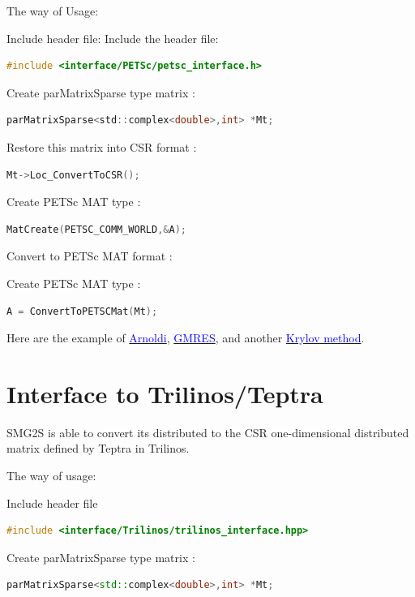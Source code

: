 \documentclass[a4paper, 10 pt]{report}
\begin{document}
	The way of Usage:
	
	Include header file:
	Include the header file:
   \begin{lstlisting}[language=C,frame=single]
   #include <interface/PETSc/petsc_interface.h>
   \end{lstlisting}
	
	Create parMatrixSparse type matrix :
   \begin{lstlisting}[language=C,frame=single]
  parMatrixSparse<std::complex<double>,int> *Mt;
   \end{lstlisting}

	Restore this matrix into CSR format :
   \begin{lstlisting}[language=C,frame=single]
   Mt->Loc_ConvertToCSR();
	\end{lstlisting}

	Create PETSc MAT type :
   \begin{lstlisting}[language=C,frame=single]
   MatCreate(PETSC_COMM_WORLD,&A); 
	\end{lstlisting}

   Convert to PETSc MAT format :

	Create PETSc MAT type :
   \begin{lstlisting}[language=C,frame=single]
   A = ConvertToPETSCMat(Mt); 
   \end{lstlisting}

    Here are the example of \href{https://github.com/SMG2S/SMG2S/tree/master/example/arnoldi}{\textcolor{blue}{Arnoldi}}, \href{https://github.com/SMG2S/SMG2S/tree/master/example/gmres}{\textcolor{blue}{GMRES}}, and another  \href{https://github.com/SMG2S/SMG2S/tree/master/example/krylov}{\textcolor{blue}{Krylov method}}.
    
	\section{Interface to Trilinos/Teptra}
	
	SMG2S is able to convert its distributed to the CSR one-dimensional distributed matrix defined by Teptra in Trilinos.
	
	The way of usage:
	
	 Include header file

	\begin{lstlisting}[language=C++,frame=single]
   #include <interface/Trilinos/trilinos_interface.hpp>
	\end{lstlisting}
	
	Create parMatrixSparse type matrix :
	\begin{lstlisting}[language=C++,frame=single]
   parMatrixSparse<std::complex<double>,int> *Mt;
   \end{lstlisting}
	
\end{document}

